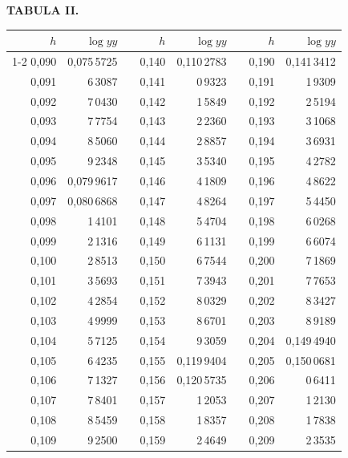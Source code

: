 \endgroup
\clearpage
{}
\begingroup
\centering
\fontsize{9}{9}\selectfont
\setlength{\tabcolsep}{8pt}
\renewcommand{\arraystretch}{1}
\setlength{\parskip}{0pt}
\textbf{TABULA II.}
\par\vspace{7pt}
\begin{tabular}{|r|r|@{}p{9pt}@{}|r|r|@{}p{9pt}@{}|r|r|}
\hline
\(h\) & \(\log yy\) & & \(h\) & \(\log yy\) & & \(h\) & \(\log yy\) \\
\cline{1-2}\cline{4-5}\cline{7-8}
0,090 & 0,075\,5725 &  & 0,140 & 0,110\,2783 &  & 0,190 & 0,141\,3412 \\
0,091 & 6\,3087 &  & 0,141 & 0\,9323 &  & 0,191 & 1\,9309 \\
0,092 & 7\,0430 &  & 0,142 & 1\,5849 &  & 0,192 & 2\,5194 \\
0,093 & 7\,7754 &  & 0,143 & 2\,2360 &  & 0,193 & 3\,1068 \\
0,094 & 8\,5060 &  & 0,144 & 2\,8857 &  & 0,194 & 3\,6931 \\
0,095 & 9\,2348 &  & 0,145 & 3\,5340 &  & 0,195 & 4\,2782 \\[3pt]
0,096 & 0,079\,9617 &  & 0,146 & 4\,1809 &  & 0,196 & 4\,8622 \\
0,097 & 0,080\,6868 &  & 0,147 & 4\,8264 &  & 0,197 & 5\,4450 \\
0,098 & 1\,4101 &  & 0,148 & 5\,4704 &  & 0,198 & 6\,0268 \\
0,099 & 2\,1316 &  & 0,149 & 6\,1131 &  & 0,199 & 6\,6074 \\
0,100 & 2\,8513 &  & 0,150 & 6\,7544 &  & 0,200 & 7\,1869 \\[3pt]
0,101 & 3\,5693 &  & 0,151 & 7\,3943 &  & 0,201 & 7\,7653 \\
0,102 & 4\,2854 &  & 0,152 & 8\,0329 &  & 0,202 & 8\,3427 \\
0,103 & 4\,9999 &  & 0,153 & 8\,6701 &  & 0,203 & 8\,9189 \\
0,104 & 5\,7125 &  & 0,154 & 9\,3059 &  & 0,204 & 0,149\,4940 \\
0,105 & 6\,4235 &  & 0,155 & 0,119\,9404 &  & 0,205 & 0,150\,0681 \\[3pt]
0,106 & 7\,1327 &  & 0,156 & 0,120\,5735 &  & 0,206 & 0\,6411 \\
0,107 & 7\,8401 &  & 0,157 & 1\,2053 &  & 0,207 & 1\,2130 \\
0,108 & 8\,5459 &  & 0,158 & 1\,8357 &  & 0,208 & 1\,7838 \\
0,109 & 9\,2500 &  & 0,159 & 2\,4649 &  & 0,209 & 2\,3535 \\

\end{tabular}
